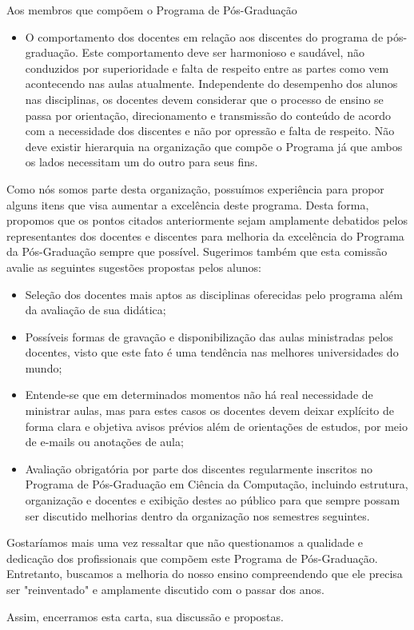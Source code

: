\documentclass[11pt]{letter}
\begin{document}
\begin{letter}{Aos membros que compõem o Programa de Pós-Graduação}
\begin{itemize}
	\item O comportamento dos docentes em relação aos discentes do programa de pós-graduação. Este comportamento deve ser harmonioso e saudável, não conduzidos por superioridade e falta de respeito entre as partes como vem acontecendo nas aulas atualmente. Independente do desempenho dos alunos nas disciplinas, os docentes devem considerar que o processo de ensino se passa por orientação, direcionamento e transmissão do conteúdo de acordo com a necessidade dos discentes e não por opressão e falta de respeito. Não deve existir hierarquia na organização que compõe o Programa já que ambos os lados necessitam um do outro para seus fins.

\end{itemize}

Como nós somos parte desta organização, possuímos experiência para propor alguns itens que visa aumentar a excelência deste programa. Desta forma, propomos que os pontos citados anteriormente sejam amplamente debatidos pelos representantes dos docentes e discentes para melhoria da excelência do Programa da Pós-Graduação sempre que possível. Sugerimos também que esta comissão avalie as seguintes sugestões propostas pelos alunos:

\begin{itemize}
	\item Seleção dos docentes mais aptos as disciplinas oferecidas pelo programa além da avaliação de sua didática;
	\item Possíveis formas de gravação e disponibilização das aulas ministradas pelos docentes, visto que este fato é uma tendência nas melhores universidades do mundo;
	\item Entende-se que em determinados momentos não há real necessidade de ministrar aulas, mas para estes casos os docentes devem deixar explícito de forma clara e objetiva avisos prévios além de orientações de estudos, por meio de e-mails ou anotações de aula;
	\item Avaliação obrigatória por parte dos discentes regularmente inscritos no Programa de Pós-Graduação em Ciência da Computação, incluindo estrutura, organização e docentes e exibição destes ao público para que sempre possam ser discutido melhorias dentro da organização nos semestres seguintes.
\end{itemize}

Gostaríamos mais uma vez ressaltar que não questionamos a qualidade e dedicação dos profissionais que compõem este Programa de Pós-Graduação. Entretanto, buscamos a melhoria do nosso ensino compreendendo que ele precisa ser "reinventado" e amplamente discutido com o passar dos anos.

\closing{Assim, encerramos esta carta, sua discussão e propostas.}
\end{letter}
\end{document}
